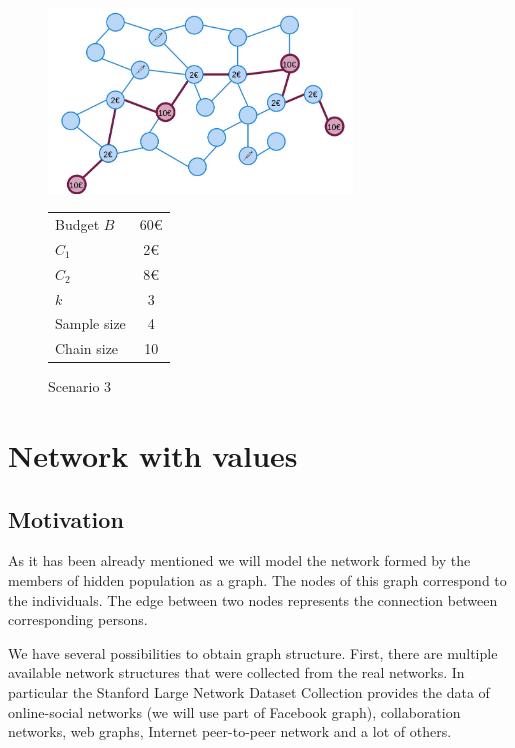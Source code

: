 \documentclass[12pt]{report}
\begin{document}
\begin{figure}[h]
  \begin{minipage}[c]{0.67\textwidth}
    \includegraphics[width=0.72\textwidth]{skipping3}
  \end{minipage}\hfill
  \begin{minipage}[c]{0.3\textwidth}
 	\caption{Scenario 3}
		
		\begin{tabular}{l c}
  			Budget $B$ & 60\euro \\
 		    $C_1$ & 2\euro \\
  		    $C_2$ & 8\euro \\
  		    $k$   & 3 \\
  		    Sample size  & 4 \\
		    Chain size   & 10 \\
		\end{tabular}	
  \end{minipage}
\end{figure}


\chapter{Network with values}

\section{Motivation}
As it has been already mentioned we will model the network formed by the members of hidden population as a graph. The nodes of this graph correspond to the individuals. The edge between two nodes represents the connection between corresponding persons.

We have several possibilities to obtain graph structure. First, there are multiple available network structures that were collected from the real networks. In particular the Stanford Large Network Dataset Collection \cite{Facebook} provides the data of online-social networks (we will use part of Facebook graph), collaboration networks,  web graphs, Internet peer-to-peer network and a lot of others.
\end{document}
